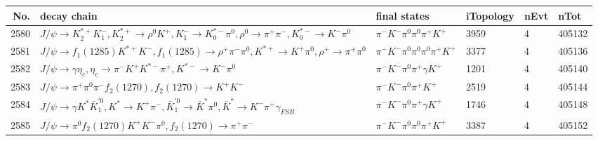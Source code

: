 \begin{table}[htbp] 
\begin{center}
\begin{small}
\begin{tabular}{rlllll}\hline\hline
 No. & decay chain & final states &  iTopology & nEvt & nTot \\\hline
2580&$J/\psi       \rightarrow K_2^{*+}       K_{1}^{-}      , K_2^{*+}        \rightarrow \rho^{0}      K^{+}          , K_{1}^{-}       \rightarrow K_{0}^{*-}     \pi^{0}        , \rho^{0}       \rightarrow \pi^{+}        \pi^{-}        , K_{0}^{*-}      \rightarrow K^{-}          \pi^{0}        $&$\pi^{-}        K^{-}          \pi^{0}        \pi^{0}        \pi^{+}        K^{+}          $& 3959&    4&405132\\
2581&$J/\psi       \rightarrow f_{1}(1285)    K^{*+}         K^{-}          , f_{1}(1285)     \rightarrow \rho^{+}      \pi^{-}        \pi^{0}        , K^{*+}          \rightarrow K^{+}          \pi^{0}        , \rho^{+}       \rightarrow \pi^{+}        \pi^{0}        $&$\pi^{-}        K^{-}          \pi^{0}        \pi^{0}        \pi^{0}        \pi^{+}        K^{+}          $& 3377&    4&405136\\
2582&$J/\psi       \rightarrow \gamma       \eta_{c}    , \eta_{c}     \rightarrow \pi^{-}        K^{+}          K^{*-}         \pi^{+}        , K^{*-}          \rightarrow K^{-}          \pi^{0}        $&$\pi^{-}        K^{-}          \pi^{0}        \pi^{+}        \gamma       K^{+}          $& 1201&    4&405140\\
2583&$J/\psi       \rightarrow \pi^{+}        \pi^{0}        \pi^{-}        f_{2}(1270)    , f_{2}(1270)     \rightarrow K^{+}          K^{-}          $&$\pi^{-}        K^{-}          \pi^{0}        \pi^{+}        K^{+}          $& 2519&    4&405144\\
2584&$J/\psi       \rightarrow \gamma       K^{*}          \bar{K}_1^{'0}, K^{*}           \rightarrow K^{+}          \pi^{-}        , \bar{K}_1^{'0} \rightarrow \bar{K}^{*}   \pi^{0}        , \bar{K}^{*}    \rightarrow K^{-}          \pi^{+}        \gamma_{FSR} $&$\pi^{-}        K^{-}          \pi^{0}        \pi^{+}        \gamma       K^{+}          $& 1746&    4&405148\\
2585&$J/\psi       \rightarrow \pi^{0}        f_{2}(1270)    K^{+}          K^{-}          \pi^{0}        , f_{2}(1270)     \rightarrow \pi^{+}        \pi^{-}        $&$\pi^{-}        K^{-}          \pi^{0}        \pi^{0}        \pi^{+}        K^{+}          $& 3387&    4&405152\\

\end{tabular}
\end{small}
\end{center}
\end{table}
